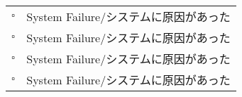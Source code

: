 \begin{Form}
\begin{tabular}{rl}
$\square$ & System Failure/システムに原因があった \\
$\square$ & System Failure/システムに原因があった \\
$\square$ & System Failure/システムに原因があった \\
$\square$ & System Failure/システムに原因があった \\
\end{tabular}
\vspace{.05in}


\end{Form}